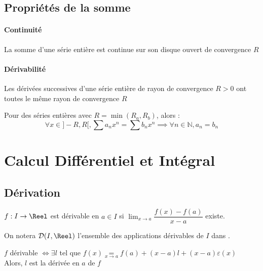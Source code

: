 \documentclass[11pt,a4paper,fleqn,pdftex]{report}
\begin{document}
\section{Propriétés de la somme}
\subsubsection*{Continuité}
\begin{theorem}
La somme d'une série entière est continue sur son disque ouvert de convergence $R$
\end{theorem}
\subsubsection*{Dérivabilité}
\begin{theorem}
Les dérivées successives d'une série entière de rayon de convergence $R>0$ ont toutes le même rayon de convergence $R$
\end{theorem}
\begin{theorem}
Pour des séries entières avec $R = \min (R_a,R_b)$, alors : 
\[
\forall x \in ]-R,R[, \sum a_n x^n = \sum b_n x^n \implies \forall n \in \mathbb{N}, a_n = b_n
\]
\end{theorem}

\chapter{Calcul Différentiel et Intégral}
\section{Dérivation}
\begin{dfn}
$f : I \to \Reel$ est dérivable en $a \in I$ si $\lim_{x\to a} \dfrac{f(x) - f(a)}{x - a}$ existe.
\end{dfn}
On notera $\mathcal{D}(I,\Reel )$ l'ensemble des applications dérivables de $I$ dans \Reel{}.

\begin{theorem}
$f$ dérivable $\Leftrightarrow \exists l$ tel que $f(x) \underset{x\to a}{=} f(a) + (x-a)l + (x-a)\varepsilon (x)$\\
Alors, $l$ est la dérivée en $a$ de $f$
\end{theorem}
\end{document}
